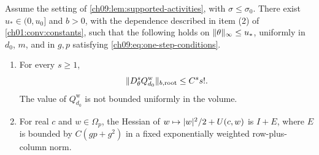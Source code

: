 \begin{proposition}\label{ch09:prop:one-step-interaction}
Assume the setting of \cref{ch09:lem:supported-activities}, with $\sigma\le\sigma_0$. There exist $u_*\in(0,u_0]$ and $b>0$, with the dependence described in item (2) of \cref{ch01:conv:constants}, such that the following holds on $\lVert \theta\rVert_\infty\le u_*$, uniformly in $d_0$, $m$, and in $g,p$ satisfying \eqref{ch09:eq:one-step-conditions}.
\begin{enumerate}
\item For every $s\ge1$,
\[
 \lVert D_\theta^sQ_{d_0}^{\mathrm w}\rVert_{b,\mathrm{root}}\le C^ss!.
\]
The value of $Q_{d_0}^{\mathrm w}$ is not bounded uniformly in the volume.
\item For real $c$ and $w\in\Omega_p$, the Hessian of $w\mapsto\lvert w\rvert^2/2+U(c,w)$ is $I+E$, where $E$ is bounded by $C(gp+g^2)$ in a fixed exponentially weighted row-plus-column norm.
\end{enumerate}
\end{proposition}

